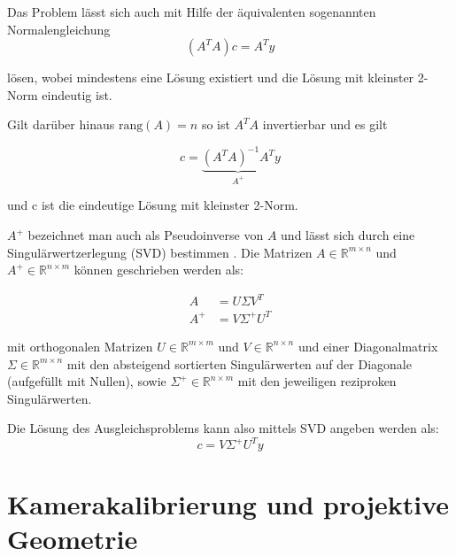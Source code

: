Das Problem lässt sich auch mit Hilfe der äquivalenten sogenannten Normalengleichung
\begin{equation*}
	(A^TA)c = A^Ty
\end{equation*}

lösen, wobei mindestens eine Lösung existiert und die Lösung mit kleinster 2-Norm eindeutig ist. 

Gilt darüber hinaus $\text{rang}\left(A\right) = n$ so ist $A^TA$ invertierbar und es gilt 

\begin{equation}\label{eq:normaleq}
c = \underbrace{(A^TA)^{-1}A^T}_{A^+}y
\end{equation}

und c ist die eindeutige Lösung mit kleinster 2-Norm.

$A^+$ bezeichnet man auch als Pseudoinverse von $A$ und lässt sich durch eine Singulärwertzerlegung (SVD) bestimmen \cite{Stoer2011}. Die Matrizen $A\in\mathbb{R}^{m\times n}$ und $A^+\in\mathbb{R}^{n\times m}$ können geschrieben werden als:

\[
\begin{aligned}
A &= U\Sigma V^T \\
A^+ &= V\Sigma^+U^T
\end{aligned}
\]

mit orthogonalen Matrizen $U\in\mathbb{R}^{m\times m}$ und $V\in\mathbb{R}^{n\times n}$ und einer Diagonalmatrix $\Sigma\in\mathbb{R}^{m\times n}$ mit den absteigend sortierten Singulärwerten auf der Diagonale (aufgefüllt mit Nullen), sowie $\Sigma^+\in\mathbb{R}^{n\times m}$ mit den jeweiligen reziproken Singulärwerten.


Die Lösung des Ausgleichsproblems kann also mittels SVD angeben werden als:
\[
c = V\Sigma^+U^Ty
\]



\section{Kamerakalibrierung und projektive Geometrie}
\label{s:calib}

